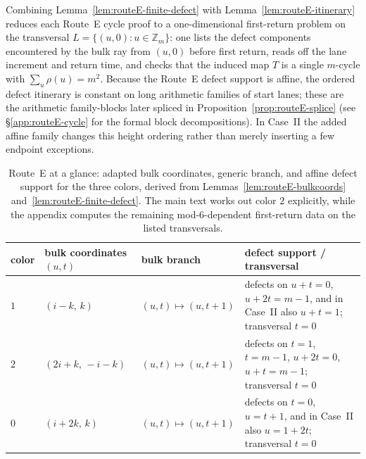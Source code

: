 \documentclass[11pt]{article}
\newcommand{\Zm}{\mathbb Z_m}
\begin{document}
Combining Lemma~\ref{lem:routeE-finite-defect} with Lemma~\ref{lem:routeE-itinerary} reduces each Route~E cycle proof to a one-dimensional first-return problem on the transversal $L=\{(u,0):u\in\Zm\}$: one lists the defect components encountered by the bulk ray from $(u,0)$ before first return, reads off the lane increment and return time, and checks that the induced map $T$ is a single $m$-cycle with $\sum_u\rho(u)=m^2$.
Because the Route~E defect support is affine, the ordered defect itinerary is constant on long arithmetic families of start lanes; these are the arithmetic family-blocks later spliced in Proposition~\ref{prop:routeE-splice} (see \S\ref{app:routeE-cycle} for the formal block decompositions).
In Case~II the added affine family changes this height ordering rather than merely inserting a few endpoint exceptions.

\begin{table}[t]
\centering
\footnotesize
\setlength{\tabcolsep}{4pt}
\begin{tabularx}{\textwidth}{@{}l l l >{\raggedright\arraybackslash}X@{}}
\toprule
color & bulk coordinates $(u,t)$ & bulk branch & defect support / transversal \\
\midrule
$1$ & $(i-k,\,k)$ & $(u,t)\mapsto(u,t+1)$ & defects on $u+t=0$, $u+2t=m-1$, and in Case~II also $u+t=1$; transversal $t=0$ \\
$2$ & $(2i+k,\,-i-k)$ & $(u,t)\mapsto(u,t+1)$ & defects on $t=1$, $t=m-1$, $u+2t=0$, $u+t=m-1$; transversal $t=0$ \\
$0$ & $(i+2k,\,k)$ & $(u,t)\mapsto(u,t+1)$ & defects on $t=0$, $u=t+1$, and in Case~II also $u=1+2t$; transversal $t=0$ \\
\bottomrule
\end{tabularx}
\caption{Route~E at a glance: adapted bulk coordinates, generic branch, and affine defect support for the three colors, derived from Lemmas~\ref{lem:routeE-bulkcoords} and~\ref{lem:routeE-finite-defect}. The main text works out color $2$ explicitly, while the appendix computes the remaining mod-$6$-dependent first-return data on the listed transversals.}
\label{tab:routeE-summary}
\end{table}
\end{document}
